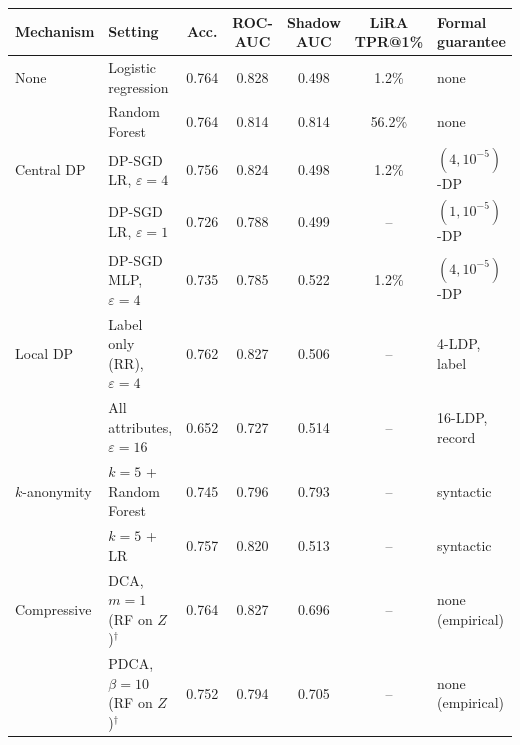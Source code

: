 \begin{tabular}{@{}llccccl@{}}
\toprule
Mechanism & Setting & Acc. & ROC-AUC & Shadow AUC & LiRA TPR@1\% & Formal guarantee \\
\midrule
None & Logistic regression & 0.764 & 0.828 & 0.498 & 1.2\% & none \\
 & Random Forest & 0.764 & 0.814 & 0.814 & 56.2\% & none \\
\addlinespace[2pt]
Central DP & DP-SGD LR, $\varepsilon{=}4$ & 0.756 & 0.824 & 0.498 & 1.2\% & $(4,10^{-5})$-DP \\
 & DP-SGD LR, $\varepsilon{=}1$ & 0.726 & 0.788 & 0.499 & -- & $(1,10^{-5})$-DP \\
 & DP-SGD MLP, $\varepsilon{=}4$ & 0.735 & 0.785 & 0.522 & 1.2\% & $(4,10^{-5})$-DP \\
\addlinespace[2pt]
Local DP & Label only (RR), $\varepsilon{=}4$ & 0.762 & 0.827 & 0.506 & -- & 4-LDP, label \\
 & All attributes, $\varepsilon{=}16$ & 0.652 & 0.727 & 0.514 & -- & 16-LDP, record \\
\addlinespace[2pt]
$k$-anonymity & $k{=}5$ + Random Forest & 0.745 & 0.796 & 0.793 & -- & syntactic \\
 & $k{=}5$ + LR & 0.757 & 0.820 & 0.513 & -- & syntactic \\
\addlinespace[2pt]
Compressive & DCA, $m{=}1$ (RF on $Z$)$^\dagger$ & 0.764 & 0.827 & 0.696 & -- & none (empirical) \\
 & PDCA, $\beta{=}10$ (RF on $Z$)$^\dagger$ & 0.752 & 0.794 & 0.705 & -- & none (empirical) \\
\bottomrule
\end{tabular}
